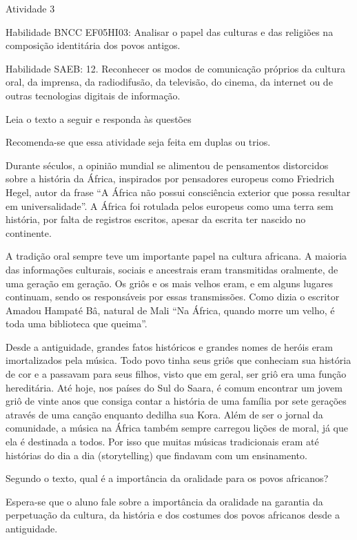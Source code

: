 Atividade 3

Habilidade BNCC EF05HI03: Analisar o papel das culturas e das religiões
na composição identitária dos povos antigos.

Habilidade SAEB: 12. Reconhecer os modos de comunicação próprios da
cultura oral, da imprensa, da radiodifusão, da televisão, do cinema, da
internet ou de outras tecnologias digitais de informação.

Leia o texto a seguir e responda às questões

Recomenda-se que essa atividade seja feita em duplas ou trios.

Durante séculos, a opinião mundial se alimentou de pensamentos
distorcidos sobre a história da África, inspirados por pensadores
europeus como Friedrich Hegel, autor da frase ``A África não possui
consciência exterior que possa resultar em universalidade''. A África
foi rotulada pelos europeus como uma terra sem história, por falta de
registros escritos, apesar da escrita ter nascido no continente.

A tradição oral sempre teve um importante papel na cultura africana. A
maioria das informações culturais, sociais e ancestrais eram
transmitidas oralmente, de uma geração em geração. Os griôs e os mais
velhos eram, e em alguns lugares continuam, sendo os responsáveis por
essas transmissões. Como dizia o escritor Amadou Hampaté Bâ, natural de
Mali ``Na África, quando morre um velho, é toda uma biblioteca que
queima''.

Desde a antiguidade, grandes fatos históricos e grandes nomes de heróis
eram imortalizados pela música. Todo povo tinha seus griôs que conheciam
sua história de cor e a passavam para seus filhos, visto que em geral,
ser griô era uma função hereditária. Até hoje, nos países do Sul do
Saara, é comum encontrar um jovem griô de vinte anos que consiga contar
a história de uma família por sete gerações através de uma canção
enquanto dedilha sua Kora. Além de ser o jornal da comunidade, a música
na África também sempre carregou lições de moral, já que ela é destinada
a todos. Por isso que muitas músicas tradicionais eram até histórias do
dia a dia (storytelling) que findavam com um ensinamento.

Segundo o texto, qual é a importância da oralidade para os povos
africanos?

Espera-se que o aluno fale sobre a importância da oralidade na garantia
da perpetuação da cultura, da história e dos costumes dos povos
africanos desde a antiguidade.

